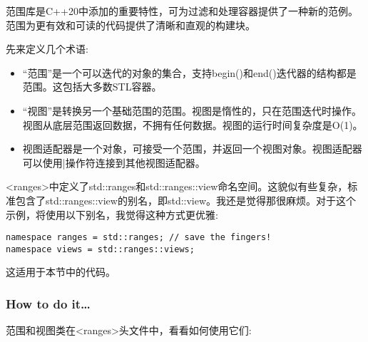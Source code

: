 
范围库是C++20中添加的重要特性，可为过滤和处理容器提供了一种新的范例。范围为更有效和可读的代码提供了清晰和直观的构建块。

先来定义几个术语:

\begin{itemize}
\item 
“范围”是一个可以迭代的对象的集合，支持begin()和end()迭代器的结构都是范围。这包括大多数STL容器。

\item 
“视图”是转换另一个基础范围的范围。视图是惰性的，只在范围迭代时操作。视图从底层范围返回数据，不拥有任何数据。视图的运行时间复杂度是O(1)。

\item 
视图适配器是一个对象，可接受一个范围，并返回一个视图对象。视图适配器可以使用|操作符连接到其他视图适配器。
\end{itemize}

\begin{tcolorbox}[colback=webgreen!5!white,colframe=webgreen!75!black,title=Note]
<ranges>中定义了std::ranges和std::ranges::view命名空间。这貌似有些复杂，标准包含了std::ranges::view的别名，即std::view。我还是觉得那很麻烦。对于这个示例，将使用以下别名，我觉得这种方式更优雅:

\begin{lstlisting}[style=styleCXX]
namespace ranges = std::ranges; // save the fingers!
namespace views = std::ranges::views;
\end{lstlisting}

这适用于本节中的代码。
\end{tcolorbox}

\subsubsection{How to do it…}

范围和视图类在<ranges>头文件中，看看如何使用它们:

